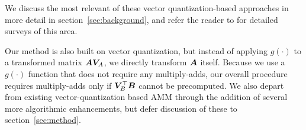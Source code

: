 We discuss the most relevant of these vector quantization-based approaches in more detail in section~\ref{sec:background}, and refer the reader to \cite{learningToHashSurvey, hashingSimilaritySurvey} for detailed surveys of this area. %

Our method is also built on vector quantization, but instead of applying $g(\cdot)$ to a transformed matrix $\bm{A} \bm{V}_A$, we directly transform $\bm{A}$ itself. Because we use a $g(\cdot)$ function that does not require any multiply-adds, our overall procedure requires multiply-adds only if $\bm{V}_B^\top \bm{B}$ cannot be precomputed. We also depart from existing vector-quantization based AMM through the addition of several more algorithmic enhancements, but defer discussion of these to section~\ref{sec:method}.




